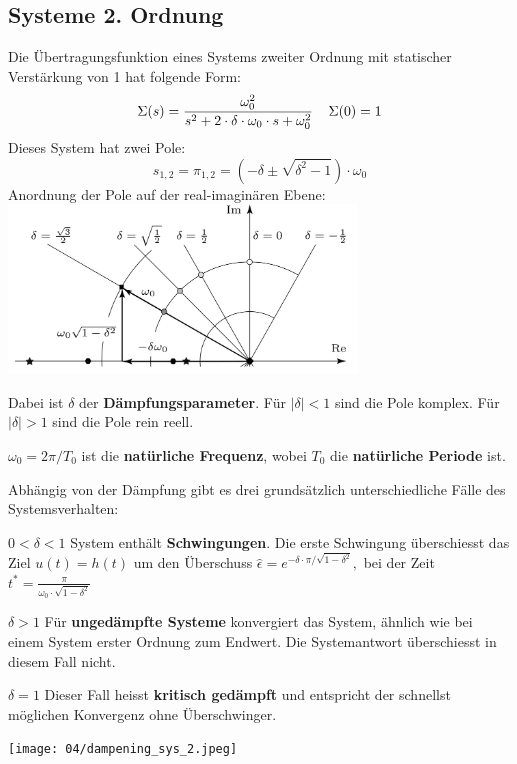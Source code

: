     \subsection{Systeme 2. Ordnung}
        Die Übertragungsfunktion eines Systems zweiter Ordnung mit statischer Verstärkung von 1 hat folgende Form:
        \[\Sigma(s) = \frac{\omega_0^2}{s^2 + 2 \cdot \delta \cdot \omega_0\cdot s + \omega_0^2} \hspace{4mm} \Sigma(0) = 1
        \]
        Dieses System hat zwei Pole: 
        \[
        s_{1,2} = \pi_{1,2} = (-\delta \pm \sqrt{\delta^2-1}) \cdot \omega_0
        \]
        Anordnung der Pole auf der real-imaginären Ebene:
        \includegraphics[width=\linewidth,height=45mm]{images/04/Anordnung_Polstellen.jpg}
        
        Dabei ist $\delta$ der \textbf{Dämpfungsparameter}. 
        Für $| \delta | < 1$ sind die Pole komplex.
        Für $| \delta | > 1$ sind die Pole rein reell.
        
        $\omega_0 = 2\pi/T_0$ ist die \textbf{natürliche Frequenz}, wobei $T_0$ die \textbf{natürliche Periode} ist.
        
        Abhängig von der Dämpfung gibt es drei grundsätzlich unterschiedliche Fälle des Systemsverhalten:
        
        $\boxed{ 0 < \delta < 1 }$  System enthält \textbf{Schwingungen}. 
        Die erste Schwingung überschiesst das Ziel $u(t) = h(t)$ um den Überschuss $\hat{\epsilon} = e^{-\delta\cdot\pi/\sqrt{1-\delta^2}},$ bei der Zeit $t^* =\frac{\pi}{\omega_0\cdot\sqrt{1-\delta^2}}$
        
        $\boxed{\delta > 1}$ Für \textbf{ungedämpfte Systeme} konvergiert das System, ähnlich wie bei einem System erster Ordnung zum Endwert. Die Systemantwort überschiesst in diesem Fall nicht. 
        
        $\boxed{ \delta = 1}$ Dieser Fall heisst \textbf{kritisch gedämpft} und entspricht der schnellst möglichen Konvergenz ohne Überschwinger.
        
        \begin{center}
            \texttt{[image: 04/dampening\_sys\_2.jpeg]}
        \end{center}
        
